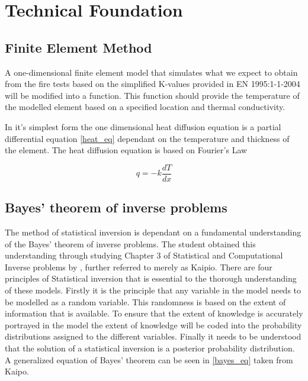 \chapter{Technical Foundation}
\section{Finite Element Method}
A one-dimensional finite element model that simulates what we expect to obtain from the fire tests based on the simplified K-values provided in EN 1995:1-1-2004 will be modified into a function.
	 This function should provide the temperature of the modelled element based on a specified location and thermal conductivity.
	 
	 In it's simplest form the one dimensional heat diffusion equation is a partial differential equation \ref{heat_eq} dependant on the temperature and thickness of the element. 
	The heat diffusion equation is based on Fourier's Law
	
	
	\begin{equation}
	\label{heat_eq}
		q = -k \frac{dT}{dx}
	\end{equation}

\section{Bayes' theorem of inverse problems}
	The method of statistical inversion is dependant on a fundamental understanding of the Bayes' theorem of inverse problems. 
	The student obtained this understanding through studying Chapter 3 of Statistical and Computational Inverse problems by \citet{Kaipo:2005}, further referred to merely as Kaipio. 
	There are four principles of Statistical inversion that is essential to the thorough understanding of these models. 
	Firstly it is the principle that any variable in the model needs to be modelled as a random variable. 
	This randomness is based on the extent of information that is available. 
	To ensure that the extent of knowledge is accurately portrayed in the model the extent of knowledge will be coded into the probability distributions assigned to the different variables. 
	Finally it needs to be understood that the solution of a statistical inversion is a posterior probability distribution.
	A generalized equation of Bayes' theorem can be seen in \ref{bayes_eq} taken from Kaipo. 
	
